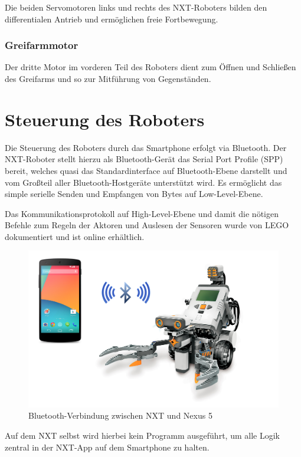 Die beiden Servomotoren links und rechts des NXT-Roboters bilden den differentialen Antrieb und ermöglichen freie Fortbewegung.

\subsubsection{Greifarmmotor}
\label{greifarm}
Der dritte Motor im vorderen Teil des Roboters dient zum Öffnen und Schließen des Greifarms und so zur Mitführung von Gegenständen.

\section{Steuerung des Roboters}

Die Steuerung des Roboters durch das Smartphone erfolgt via Bluetooth. Der NXT-Roboter stellt hierzu als Bluetooth-Gerät das Serial Port Profile (SPP) bereit, welches quasi das Standardinterface auf Bluetooth-Ebene darstellt und vom Großteil aller Bluetooth-Hostgeräte unterstützt wird. Es ermöglicht das simple serielle Senden und Empfangen von Bytes auf Low-Level-Ebene.

Das Kommunikationsprotokoll auf High-Level-Ebene und damit die nötigen Befehle zum Regeln der Aktoren und Auslesen der Sensoren wurde von LEGO dokumentiert und ist online erhältlich\cite{nxt_comm_protocol}.

\begin{figure}[h]
\centering
\includegraphics[width=\textwidth/2]{Bilder/Robot/bluetooth}
\caption{Bluetooth-Verbindung zwischen NXT und Nexus 5}
\label{fig:bluetooth}
\end{figure}

Auf dem NXT selbst wird hierbei kein Programm ausgeführt, um alle Logik zentral in der NXT-App auf dem Smartphone zu halten.

